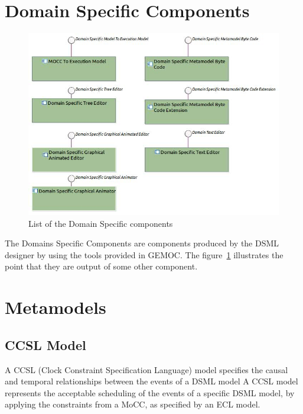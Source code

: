 \documentclass{gemoc} %
\begin{document}
\section{Domain Specific Components}
\begin{figure}[htp]
	\begin{center}
	\includegraphics*[trim=0.0cm 0.0cm 0cm 0.0cm, clip=true, width=1.0\linewidth]{../images/DomainSpecificComponents.jpg}
	\caption{List of the Domain Specific components}
	\label{fig:DomainSpecificComponentList}
	\end{center}
\end{figure}
The Domains Specific Components are components produced by the DSML designer by using the tools provided in GEMOC. The figure~\ref{fig:DomainSpecificComponentList} illustrates the point that they are output of some other component.
\section{Metamodels}
\subsection{CCSL Model}
\label{sec:CCSL_Model}
A CCSL (Clock Constraint Specification Language) model specifies the causal and temporal relationships between the events of a DSML model
\newline A CCSL model represents the acceptable scheduling of the events of a specific DSML model, by applying the constraints from a MoCC, as specified by an ECL model.
\end{document}
